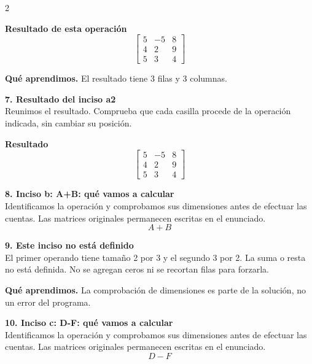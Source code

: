 \documentclass[11pt,a4paper,landscape]{article}
\begin{document}
\begin{multicols*}{2}
\begin{minipage}{\linewidth}
\par\smallskip \textbf{Resultado de esta operación}\[\begin{bmatrix}5 & -5 & 8\\4 & 2 & 9\\5 & 3 & 4\end{bmatrix}\]
\par\smallskip\textbf{Qué aprendimos.} El resultado tiene 3 filas y 3 columnas.
\end{minipage}\par\medskip
\noindent\begin{minipage}{\linewidth}\textbf{7. Resultado del inciso a2}\\[2pt]Reunimos el resultado. Comprueba que cada casilla procede de la operación indicada, sin cambiar su posición.
\par\smallskip \textbf{Resultado}\[\begin{bmatrix}5 & -5 & 8\\4 & 2 & 9\\5 & 3 & 4\end{bmatrix}\]
\end{minipage}\par\medskip
\noindent\begin{minipage}{\linewidth}\textbf{8. Inciso b: A+B: qué vamos a calcular}\\[2pt]Identificamos la operación y comprobamos sus dimensiones antes de efectuar las cuentas. Las matrices originales permanecen escritas en el enunciado.
\[A+B\]
\end{minipage}\par\medskip
\noindent\begin{minipage}{\linewidth}\textbf{9. Este inciso no está definido}\\[2pt]El primer operando tiene tamaño 2 por 3 y el segundo 3 por 2. La suma o resta no está definida. No se agregan ceros ni se recortan filas para forzarla.
\par\smallskip\textbf{Qué aprendimos.} La comprobación de dimensiones es parte de la solución, no un error del programa.
\end{minipage}\par\medskip
\noindent\begin{minipage}{\linewidth}\textbf{10. Inciso c: D-F: qué vamos a calcular}\\[2pt]Identificamos la operación y comprobamos sus dimensiones antes de efectuar las cuentas. Las matrices originales permanecen escritas en el enunciado.
\[D-F\]
\end{minipage}\par\medskip

\end{multicols*}
\end{document}
